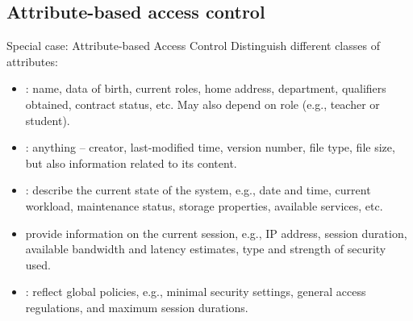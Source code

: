 \subsection{Attribute-based access control}
\begin{slide}{Special case: Attribute-based Access Control}
  Distinguish different classes of attributes:
  \begin{itemize}
  \item {}: name, data of birth, current roles, home address, department, qualifiers
    obtained, contract status, etc. May also depend on role (e.g., teacher or student).
  \item {}: anything -- creator, last-modified time, version number, file type, file
    size, but also information related to its content.
  \item {}: describe the current state of the system, e.g., date and time, current
    workload, maintenance status, storage properties, available services, etc.
  \item {} provide information on the current session, e.g., IP address, session
    duration, available bandwidth and latency estimates, type and strength of security used.
  \item {}: reflect global policies, e.g., minimal security settings, general
    access regulations, and maximum session durations.
  \end{itemize}
\end{slide}

